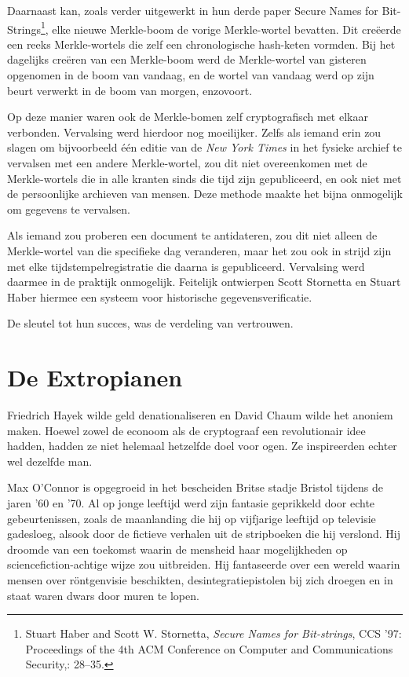 \documentclass[
  a5paper,
  smalldemyvopaper,11pt,twoside,onecolumn,openright,extrafontsizes,
hidelinks]{memoir}
\begin{document}
Daarnaast kan, zoals verder uitgewerkt in hun derde paper Secure Names
for Bit-Strings\footnote{Stuart Haber and Scott W. Stornetta,
  \emph{Secure Names for Bit-strings}, CCS '97: Proceedings of the 4th
  ACM Conference on Computer and Communications Security,: 28--35.},
elke nieuwe Merkle-boom de vorige Merkle-wortel bevatten. Dit creëerde
een reeks Merkle-wortels die zelf een chronologische hash-keten vormden.
Bij het dagelijks creëren van een Merkle-boom werd de Merkle-wortel van
gisteren opgenomen in de boom van vandaag, en de wortel van vandaag werd
op zijn beurt verwerkt in de boom van morgen, enzovoort.

Op deze manier waren ook de Merkle-bomen zelf cryptografisch met elkaar
verbonden. Vervalsing werd hierdoor nog moeilijker. Zelfs als iemand
erin zou slagen om bijvoorbeeld één editie van de \emph{New York Times}
in het fysieke archief te vervalsen met een andere Merkle-wortel, zou
dit niet overeenkomen met de Merkle-wortels die in alle kranten sinds
die tijd zijn gepubliceerd, en ook niet met de persoonlijke archieven
van mensen. Deze methode maakte het bijna onmogelijk om gegevens te
vervalsen.

Als iemand zou proberen een document te antidateren, zou dit niet alleen
de Merkle-wortel van die specifieke dag veranderen, maar het zou ook in
strijd zijn met elke tijdstempelregistratie die daarna is gepubliceerd.
Vervalsing werd daarmee in de praktijk onmogelijk. Feitelijk ontwierpen
Scott Stornetta en Stuart Haber hiermee een systeem voor historische
gegevensverificatie.

De sleutel tot hun succes, was de verdeling van vertrouwen.

\chapter{De Extropianen}\label{de-extropianen}

Friedrich Hayek wilde geld denationaliseren en David Chaum wilde het
anoniem maken. Hoewel zowel de econoom als de cryptograaf een
revolutionair idee hadden, hadden ze niet helemaal hetzelfde doel voor
ogen. Ze inspireerden echter wel dezelfde man.

Max O'Connor is opgegroeid in het bescheiden Britse stadje Bristol
tijdens de jaren '60 en '70. Al op jonge leeftijd werd zijn fantasie
geprikkeld door echte gebeurtenissen, zoals de maanlanding die hij op
vijfjarige leeftijd op televisie gadesloeg, alsook door de fictieve
verhalen uit de stripboeken die hij verslond. Hij droomde van een
toekomst waarin de mensheid haar mogelijkheden op sciencefiction-achtige
wijze zou uitbreiden. Hij fantaseerde over een wereld waarin mensen over
röntgenvisie beschikten, desintegratiepistolen bij zich droegen en in
staat waren dwars door muren te lopen.
\end{document}
